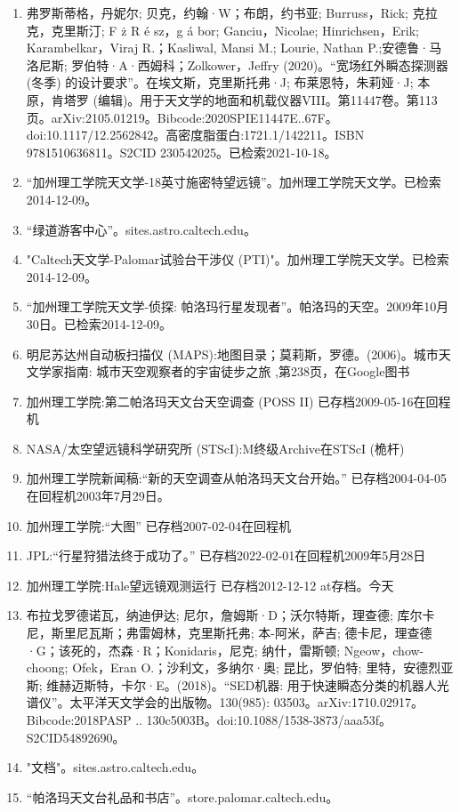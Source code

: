 \begin{enumerate}
\item 弗罗斯蒂格，丹妮尔; 贝克，约翰·W；布朗，约书亚; Burruss，Rick; 克拉克，克里斯汀; F ż R é sz，g á bor; Ganciu，Nicolae; Hinrichsen，Erik; Karambelkar，Viraj R.；Kasliwal, Mansi M.; Lourie, Nathan P.;安德鲁·马洛尼斯; 罗伯特·A·西姆科；Zolkower，Jeffry (2020)。“宽场红外瞬态探测器 (冬季) 的设计要求”。在埃文斯，克里斯托弗·J; 布莱恩特，朱莉娅·J; 本原，肯塔罗 (编辑)。用于天文学的地面和机载仪器VIII。第11447卷。第113页。arXiv:2105.01219。Bibcode:2020SPIE11447E..67F。doi:10.1117/12.2562842。高密度脂蛋白:1721.1/142211。ISBN 9781510636811。S2CID 230542025。已检索2021-10-18。
\item “加州理工学院天文学-18英寸施密特望远镜”。加州理工学院天文学。已检索2014-12-09。
\item “绿道游客中心”。sites.astro.caltech.edu。
\item "Caltech天文学-Palomar试验台干涉仪 (PTI)"。加州理工学院天文学。已检索2014-12-09。
\item “加州理工学院天文学-侦探: 帕洛玛行星发现者”。帕洛玛的天空。2009年10月30日。已检索2014-12-09。
\item 明尼苏达州自动板扫描仪 (MAPS):地图目录；莫莉斯，罗德。(2006)。城市天文学家指南: 城市天空观察者的宇宙徒步之旅 ,第238页，在Google图书
\item 加州理工学院:第二帕洛玛天文台天空调查 (POSS II) 已存档2009-05-16在回程机
\item NASA/太空望远镜科学研究所 (STScI):M终级Archive在STScI (桅杆)
\item 加州理工学院新闻稿:“新的天空调查从帕洛玛天文台开始。” 已存档2004-04-05在回程机2003年7月29日。
\item 加州理工学院:“大图” 已存档2007-02-04在回程机
\item JPL:“行星狩猎法终于成功了。” 已存档2022-02-01在回程机2009年5月28日
\item 加州理工学院:Hale望远镜观测运行 已存档2012-12-12 at存档。今天
\item 布拉戈罗德诺瓦，纳迪伊达; 尼尔，詹姆斯·D；沃尔特斯，理查德; 库尔卡尼，斯里尼瓦斯；弗雷姆林，克里斯托弗; 本-阿米，萨吉; 德卡尼，理查德·G；该死的，杰森·R；Konidaris，尼克; 纳什，雷斯顿; Ngeow，chow-choong; Ofek，Eran O.；沙利文，多纳尔·奥; 昆比，罗伯特; 里特，安德烈亚斯; 维赫迈斯特，卡尔·E。(2018)。“SED机器: 用于快速瞬态分类的机器人光谱仪”。太平洋天文学会的出版物。130(985): 03503。arXiv:1710.02917。Bibcode:2018PASP .. 130c5003B。doi:10.1088/1538-3873/aaa53f。S2CID54892690。 
\item "文档"。sites.astro.caltech.edu。
\item “帕洛玛天文台礼品和书店”。store.palomar.caltech.edu。

\end{enumerate}
